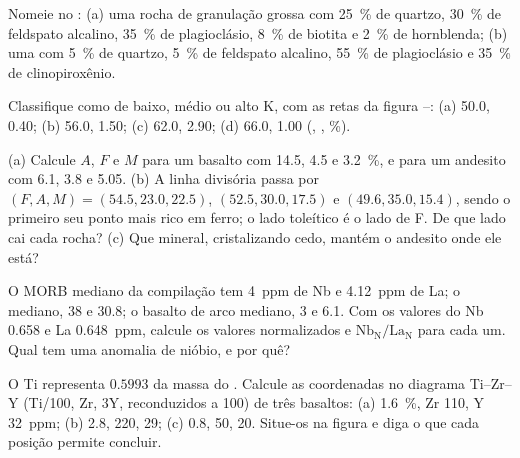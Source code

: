 \begin{exercise}[$\star$]\label{exo:b2:magmatic-series:3}
Nomeie no : (a) uma rocha de granulação grossa com \qty{25}{\percent} de quartzo,
\qty{30}{\percent} de feldspato alcalino, \qty{35}{\percent} de plagioclásio, \qty{8}{\percent} de
biotita e \qty{2}{\percent} de hornblenda; (b) uma com \qty{5}{\percent} de quartzo,
\qty{5}{\percent} de feldspato alcalino, \qty{55}{\percent} de plagioclásio e
\qty{35}{\percent} de clinopiroxênio.
\end{exercise}

\begin{exercise}[$\star$]\label{exo:b2:magmatic-series:4}
Classifique como de baixo, médio ou alto K, com as retas da figura --:
(a) 50.0, 0.40; (b) 56.0, 1.50; (c) 62.0, 2.90; (d) 66.0, 1.00 (,
, \unit{\percent}).
\end{exercise}

\begin{exercise}[$\star\star$]\label{exo:b2:magmatic-series:5}
(a) Calcule $A$, $F$ e $M$ para um basalto com  14.5,  4.5 e
 \qty{3.2}{\percent}, e para um andesito com 6.1, 3.8 e 5.05.
(b) A linha divisória passa por $(F, A, M) = (54.5, 23.0, 22.5)$, $(52.5, 30.0,
17.5)$ e $(49.6, 35.0, 15.4)$, sendo o primeiro seu ponto mais rico em ferro; o
lado toleítico é o lado de F. De que lado cai cada rocha? (c) Que
mineral, cristalizando cedo, mantém o andesito onde ele está?
\end{exercise}

\begin{exercise}[$\star\star$]\label{exo:b2:magmatic-series:6}
O MORB mediano da compilação tem \qty{4}{ppm} de Nb e \qty{4.12}{ppm} de La; o
 mediano, 38 e 30.8; o basalto de arco mediano, 3 e 6.1. Com os
valores do  Nb 0.658 e La \qty{0.648}{ppm}, calcule os valores normalizados
e $\mathrm{Nb_N}/\mathrm{La_N}$ para cada um. Qual tem uma anomalia de nióbio, e por quê?
\end{exercise}

\begin{exercise}[$\star\star$]\label{exo:b2:magmatic-series:7}
O Ti representa $0.5993$ da massa do . Calcule as coordenadas no diagrama Ti--Zr--Y
(Ti/100, Zr, $3\mathrm Y$, reconduzidos a 100) de três basaltos: (a) 
\qty{1.6}{\percent}, Zr 110, Y \qty{32}{ppm}; (b) 2.8, 220, 29; (c) 0.8, 50, 20. Situe-os
na figura e diga o que cada posição permite concluir.
\end{exercise}

